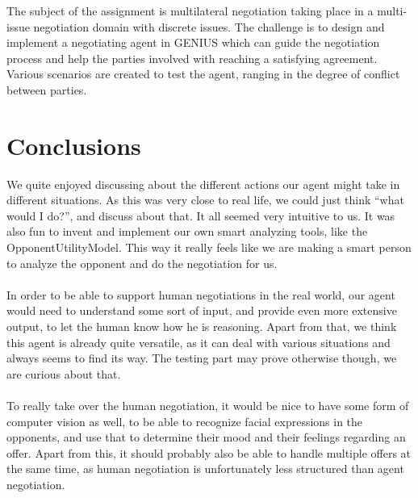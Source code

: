 \documentclass[11pt,a4paper]{article}
\begin{document}
The subject of the assignment is multilateral negotiation taking place in a multi-issue negotiation domain with discrete issues. The challenge is to design and implement a negotiating agent in GENIUS which can guide the negotiation process and help the parties involved with reaching a satisfying agreement. Various scenarios are created to test the agent, ranging in the degree of conflict between parties.\\



\newpage





\section{Conclusions}

We quite enjoyed discussing about the different actions our agent might take in different situations. As this was very close to real life, we could just think ``what would I do?'', and discuss about that. It all seemed very intuitive to us. It was also fun to invent and implement our own smart analyzing tools, like the OpponentUtilityModel. This way it really feels like we are making a smart person to analyze the opponent and do the negotiation for us.
\\\\
In order to be able to support human negotiations in the real world, our agent would need to understand some sort of input, and provide even more extensive output, to let the human know how he is reasoning. Apart from that, we think this agent is already quite versatile, as it can deal with various situations and always seems to find its way. The testing part may prove otherwise though, we are curious about that.
\\\\
To really take over the human negotiation, it would be nice to have some form of computer vision as well, to be able to recognize facial expressions in the opponents, and use that to determine their mood and their feelings regarding an offer. Apart from this, it should probably also be able to handle multiple offers at the same time, as human negotiation is unfortunately less structured than agent negotiation.

\newpage



\newpage
\end{document}
